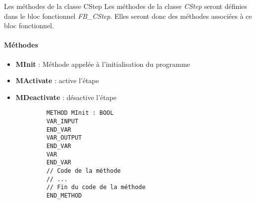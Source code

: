 \begin{UPSTIidee}{Les méthodes de la classe CStep}
    Les méthodes de la classe \emph{CStep} seront définies dans le bloc fonctionnel \emph{FB\_CStep}. Elles seront donc des méthodes associées à ce bloc fonctionnel.

    \begin{minipage}[t]{.5\linewidth}
        \paragraph{Méthodes}
        \begin{itemize}
            \item \textbf{MInit} : Méthode appelée à l'initialisation du programme
            \item \textbf{MActivate} : active l'étape
            \item \textbf{MDeactivate} : désactive l'étape
        \end{itemize}
    \end{minipage}%
    \begin{minipage}[t]{.5\linewidth}
        \begin{lstlisting}
            METHOD MInit : BOOL
            VAR_INPUT
            END_VAR
            VAR_OUTPUT
            END_VAR
            VAR
            END_VAR
            // Code de la méthode
            // ...
            // Fin du code de la méthode
            END_METHOD
        \end{lstlisting}
    \end{minipage}
\end{UPSTIidee}





